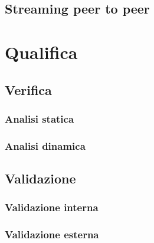    \subsection{Streaming peer to peer}

\section{Qualifica}
   \subsection{Verifica}
      \subsubsection{Analisi statica}
      \subsubsection{Analisi dinamica}
   \subsection{Validazione}
      \subsubsection{Validazione interna}
      \subsubsection{Validazione esterna}